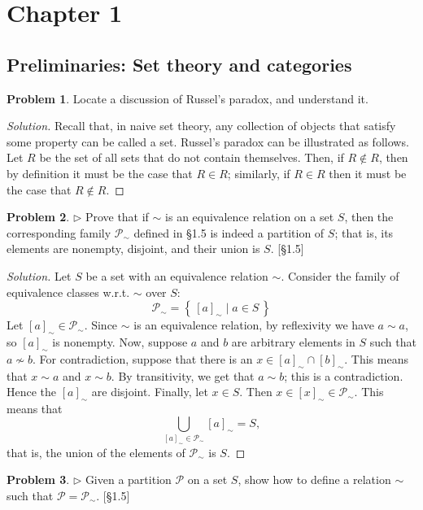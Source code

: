 \documentclass[fontsize=14pt]{scrartcl}
\theoremstyle{definition}
\newtheorem{problem-internal}{Problem}[subsection]
\newenvironment{problem}{
  \medskip
  \begin{problem-internal}
}{
  \end{problem-internal}
}
\newenvironment{solution}{
  \begin{proof}[Solution]
  \vspace{-8px}
  \setlength{\parskip}{4px}
  \setlength{\parindent}{0px}
}{
  \end{proof}
}
\newcommand{\set}[1]{\left\{\,#1\,\right\}}
\begin{document}
\section*{Chapter 1}
\subsection*{Preliminaries: Set theory and categories}
\setcounter{subsection}{1}


\begin{problem}
Locate a discussion of Russel's paradox, and understand it.
\end{problem}
\begin{solution}
Recall that, in naive set theory, any collection of objects
that satisfy some property can be called a set. Russel's paradox can be
illustrated as follows.  Let $R$ be the set of all sets that do not contain
themselves. Then, if $R\notin R$, then by definition it must be the case that
$R\in R$; similarly, if $R\in R$ then it must be the case that $R\notin R$.
\end{solution}


\begin{problem}
$\rhd$ Prove that if $\sim$ is an equivalence relation on a set $S$, then
the corresponding family $\mathscr{P}_{\sim}$ defined in \S1.5 is indeed a
partition of $S$; that is, its elements are nonempty, disjoint, and their union
is $S$. [\S1.5]
\end{problem}

\begin{solution}
Let $S$ be a set with an equivalence relation $\sim$.
Consider the family of equivalence classes w.r.t. $\sim$ over $S$:
%
\[ \mathscr{P}_{\sim} = \set{[a]_{\sim} \mid a\in S} \]
%
Let $[a]_{\sim}\in\mathscr{P}_{\sim}$. Since $\sim$ is an equivalence relation,
by reflexivity we have $a\sim a$, so $[a]_{\sim}$ is nonempty. Now, suppose
$a$ and $b$ are arbitrary elements in $S$ such that $a\not\sim b$. For
contradiction, suppose that there is an $x\in [a]_{\sim}\cap[b]_{\sim}$. This
means that $x\sim a$ and $x\sim b$. By transitivity, we get that $a\sim b$; this
is a contradiction. Hence the $[a]_{\sim}$ are disjoint. Finally, let $x\in S$.
Then $x\in[x]_{\sim}\in \mathscr{P}_{\sim}$. This means that
%
\[ \bigcup_{[a]_{\sim} \in \mathscr{P}_{\sim}} [a]_{\sim} = S, \]
%
that is, the union of the elements of $\mathscr{P}_{\sim}$ is $S$.
\end{solution}


\begin{problem}
$\rhd$ Given a partition $\mathscr{P}$ on a set $S$, show how to define a
relation $\sim$ such that $\mathscr{P} = \mathscr{P}_{\sim}$. [\S1.5]
\end{problem}
\end{document}
